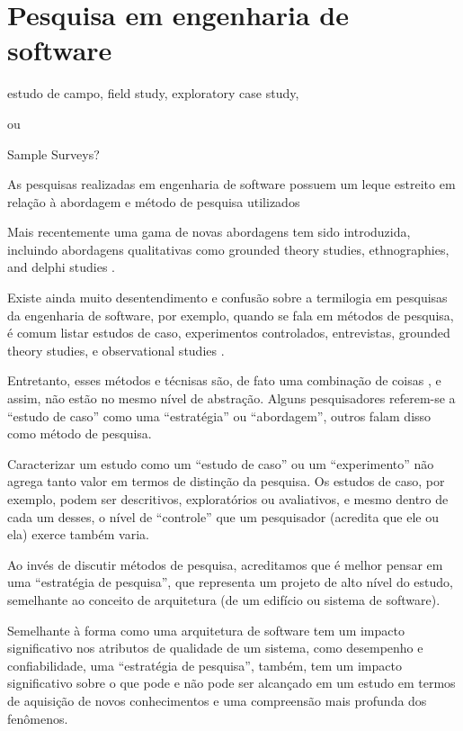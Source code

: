 \section{Pesquisa em engenharia de software}


estudo de campo, field study, exploratory case study,

ou

Sample Surveys?

As pesquisas realizadas em engenharia de software possuem um leque estreito em
relação à abordagem e método de pesquisa utilizados  \cite{glass2002research}

Mais recentemente uma gama de novas abordagens tem sido introduzida, incluindo
abordagens qualitativas como grounded theory studies, ethnographies, and delphi
studies \cite{hazzan2010qualitative}.

Existe ainda muito desentendimento e confusão sobre a termilogia em pesquisas
da engenharia de software, por exemplo, quando se fala em métodos de pesquisa,
é comum listar estudos de caso, experimentos controlados, entrevistas, grounded
theory studies, e observational studies \cite{hazzan2010qualitative}.

Entretanto, esses métodos e técnisas são, de fato uma combinação de coisas
\cite{mcgrath1981dilemmatics}, e assim, não estão no mesmo nível de abstração.
Alguns pesquisadores referem-se a ``estudo de caso'' como uma ``estratégia'' ou
``abordagem'', outros falam disso como método de pesquisa.

Caracterizar um estudo como um ``estudo de caso'' ou um ``experimento'' não
agrega tanto valor em termos de distinção da pesquisa. Os
estudos de caso, por exemplo, podem ser descritivos, exploratórios ou
avaliativos, e mesmo dentro de cada um desses, o nível de ``controle'' que um
pesquisador (acredita que ele ou ela) exerce também varia.

Ao invés de discutir
métodos de pesquisa, acreditamos que é melhor pensar em uma ``estratégia de
pesquisa'', que representa um projeto de alto nível do estudo, semelhante ao
conceito de arquitetura (de um edifício ou sistema de software).

Semelhante à
forma como uma arquitetura de software tem um impacto significativo nos
atributos de qualidade de um sistema, como desempenho e confiabilidade, uma
``estratégia de pesquisa'', também, tem um impacto significativo sobre o que pode e
não pode ser alcançado em um estudo em termos de aquisição de novos
conhecimentos e uma compreensão mais profunda dos fenômenos.

